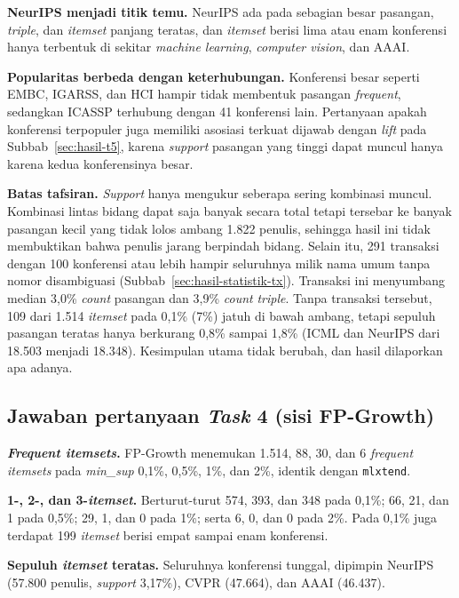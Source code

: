 \textbf{NeurIPS menjadi titik temu.} NeurIPS ada pada sebagian besar pasangan, \textit{triple}, dan \textit{itemset} panjang teratas, dan \textit{itemset} berisi lima atau enam konferensi hanya terbentuk di sekitar \textit{machine learning}, \textit{computer vision}, dan AAAI.

\textbf{Popularitas berbeda dengan keterhubungan.} Konferensi besar seperti EMBC, IGARSS, dan HCI hampir tidak membentuk pasangan \textit{frequent}, sedangkan ICASSP terhubung dengan 41 konferensi lain. Pertanyaan apakah konferensi terpopuler juga memiliki asosiasi terkuat dijawab dengan \textit{lift} pada Subbab~\ref{sec:hasil-t5}, karena \textit{support} pasangan yang tinggi dapat muncul hanya karena kedua konferensinya besar.

\textbf{Batas tafsiran.} \textit{Support} hanya mengukur seberapa sering kombinasi muncul. Kombinasi lintas bidang dapat saja banyak secara total tetapi tersebar ke banyak pasangan kecil yang tidak lolos ambang 1.822 penulis, sehingga hasil ini tidak membuktikan bahwa penulis jarang berpindah bidang. Selain itu, 291 transaksi dengan 100 konferensi atau lebih hampir seluruhnya milik nama umum tanpa nomor disambiguasi (Subbab~\ref{sec:hasil-statistik-tx}). Transaksi ini menyumbang median 3,0\% \textit{count} pasangan dan 3,9\% \textit{count} \textit{triple}. Tanpa transaksi tersebut, 109 dari 1.514 \textit{itemset} pada 0,1\% (7\%) jatuh di bawah ambang, tetapi sepuluh pasangan teratas hanya berkurang 0,8\% sampai 1,8\% (ICML dan NeurIPS dari 18.503 menjadi 18.348). Kesimpulan utama tidak berubah, dan hasil dilaporkan apa adanya.

\subsection{Jawaban pertanyaan \textit{Task} 4 (sisi FP-Growth)}
\label{sec:jawab-t4-fp}
\textbf{\textit{Frequent itemsets}.} FP-Growth menemukan 1.514, 88, 30, dan 6 \textit{frequent itemsets} pada \textit{min\_sup} 0,1\%, 0,5\%, 1\%, dan 2\%, identik dengan \texttt{mlxtend}.

\textbf{1-, 2-, dan 3-\textit{itemset}.} Berturut-turut 574, 393, dan 348 pada 0,1\%; 66, 21, dan 1 pada 0,5\%; 29, 1, dan 0 pada 1\%; serta 6, 0, dan 0 pada 2\%. Pada 0,1\% juga terdapat 199 \textit{itemset} berisi empat sampai enam konferensi.

\textbf{Sepuluh \textit{itemset} teratas.} Seluruhnya konferensi tunggal, dipimpin NeurIPS (57.800 penulis, \textit{support} 3,17\%), CVPR (47.664), dan AAAI (46.437).

